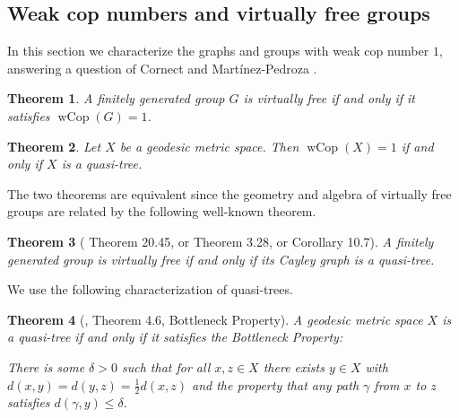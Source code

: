 \documentclass{amsart}
\newtheorem{theorem}{Theorem}[section]
\theoremstyle{definition}
\theoremstyle{remark}
\theoremstyle{remark}
\theoremstyle{definition}
\newcommand{\wCop}{\operatorname{wCop}}
\renewcommand{\leq}{\leqslant}
\begin{document}
\subsection{Weak cop numbers and virtually free groups}
In this section we characterize the graphs and groups with weak cop number $1$, answering a question of Cornect and Mart\'inez-Pedroza \cite[Question 1.4]{CoMa24arxiv}.
\begin{theorem}\label{thm:wcop-virtfree}
    A finitely generated group $G$ is virtually free if and only if it satisfies $\wCop(G)=1$.
\end{theorem}
\begin{theorem}\label{thm:wcop-qi-tree}
	Let \(X \) be a geodesic metric space.
	Then \(\wCop(X) = 1\) if and only if \(X\) is a quasi-tree.
\end{theorem}
The two theorems are equivalent since the geometry and algebra of virtually free groups are related by the following well-known theorem.
\begin{theorem}[\cite{DuKa2018} Theorem 20.45, or \cite{KrMo08} Theorem 3.28, or \cite{button23arxiv} Corollary 10.7]\label{thm:qtreevirtfree}
    A finitely generated group is virtually free if and only if its Cayley graph is a quasi-tree.
\end{theorem}
We use the following characterization of quasi-trees.
\begin{theorem}[\cite{Manning2003GeometryOP}, Theorem 4.6, Bottleneck Property]
	A geodesic metric space \(X\) is a quasi-tree if and only if it satisfies the \emph{Bottleneck Property}:

	There is some \(\delta > 0\) such that for all \(x, z \in X\) there exists \(y \in X\) with \(d(x, y) = d(y, z) = \frac12 d(x,z)\) and the property that any path \(\gamma \) from \(x\) to \(z\) satisfies \(d(\gamma , y) \leq \delta\).
\end{theorem}
\end{document}

